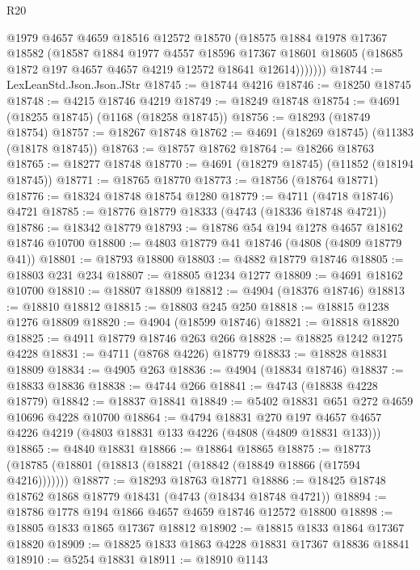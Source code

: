 \begin{lexlean}{R20}
\begin{coremodule}
            @1979
            @4657
            @4659
            @18516
            @12572
            @18570
            (@18575
              @1884
              @1978
              @17367
              @18582
              (@18587
                @1884
                @1977
                @4557
                @18596
                @17367
                @18601
                @18605
                (@18685 @1872 @197 @4657 @4657 @4219 @12572 @18641 @12614)))))))
@18744 := LexLeanStd.Json.Json.JStr
@18745 := @18744 @4216
@18746 := @18250 @18745
@18748 := @4215 @18746 @4219
@18749 := @18249 @18748
@18754 := @4691 (@18255 @18745) (@1168 (@18258 @18745))
@18756 := @18293 (@18749 @18754)
@18757 := @18267 @18748
@18762 := @4691 (@18269 @18745) (@11383 (@18178 @18745))
@18763 := @18757 @18762
@18764 := @18266 @18763
@18765 := @18277 @18748
@18770 := @4691 (@18279 @18745) (@11852 (@18194 @18745))
@18771 := @18765 @18770
@18773 := @18756 (@18764 @18771)
@18776 := @18324 @18748 @18754 @1280
@18779 := @4711 (@4718 @18746) @4721
@18785 := @18776 @18779 @18333 (@4743 (@18336 @18748 @4721))
@18786 := @18342 @18779
@18793 := @18786 @54 @194 @1278 @4657 @18162 @18746 @10700
@18800 := @4803 @18779 @41 @18746 (@4808 (@4809 @18779 @41))
@18801 := @18793 @18800
@18803 := @4882 @18779 @18746
@18805 := @18803 @231 @234
@18807 := @18805 @1234 @1277
@18809 := @4691 @18162 @10700
@18810 := @18807 @18809
@18812 := @4904 (@18376 @18746)
@18813 := @18810 @18812
@18815 := @18803 @245 @250
@18818 := @18815 @1238 @1276 @18809
@18820 := @4904 (@18599 @18746)
@18821 := @18818 @18820
@18825 := @4911 @18779 @18746 @263 @266
@18828 := @18825 @1242 @1275 @4228
@18831 := @4711 (@8768 @4226) @18779
@18833 := @18828 @18831 @18809
@18834 := @4905 @263
@18836 := @4904 (@18834 @18746)
@18837 := @18833 @18836
@18838 := @4744 @266
@18841 := @4743 (@18838 @4228 @18779)
@18842 := @18837 @18841
@18849 := @5402 @18831 @651 @272 @4659 @10696 @4228 @10700
@18864 := @4794
    @18831
    @270
    @197
    @4657
    @4657
    @4226
    @4219
    (@4803 @18831 @133 @4226 (@4808 (@4809 @18831 @133)))
@18865 := @4840 @18831
@18866 := @18864 @18865
@18875 := @18773 (@18785 (@18801 (@18813 (@18821 (@18842 (@18849 @18866 (@17594 @4216)))))))
@18877 := @18293 @18763 @18771
@18886 := @18425 @18748 @18762 @1868 @18779 @18431 (@4743 (@18434 @18748 @4721))
@18894 := @18786 @1778 @194 @1866 @4657 @4659 @18746 @12572 @18800
@18898 := @18805 @1833 @1865 @17367 @18812
@18902 := @18815 @1833 @1864 @17367 @18820
@18909 := @18825 @1833 @1863 @4228 @18831 @17367 @18836 @18841
@18910 := @5254 @18831
@18911 := @18910 @1143

\end{coremodule}
\end{lexlean}
